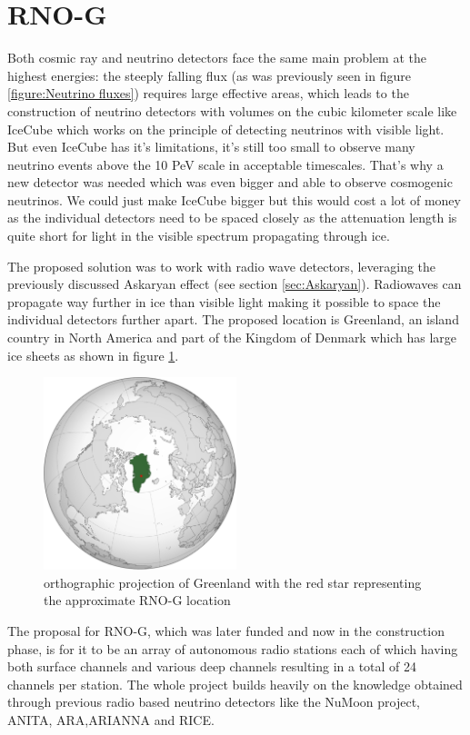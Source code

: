 \section{RNO-G}
Both cosmic ray and neutrino detectors face the same main problem at the
highest energies: the steeply falling flux (as was previously seen in figure
\ref{figure:Neutrino fluxes}) requires large effective areas, which leads to
the construction of neutrino detectors with volumes on the cubic kilometer
scale like IceCube\cite{IceCubeTechnical} which works on the principle of
detecting neutrinos with visible light.  But even IceCube has it's limitations,
it's still too small to observe many neutrino events above the 10 PeV
scale\cite{IceCubeGen2} in acceptable timescales. That's why a new detector was needed which was even
bigger and able to observe cosmogenic neutrinos.  We could just make IceCube
bigger but this would cost a lot of money as the individual detectors need to
be spaced closely as the attenuation length is quite short for light in the
visible spectrum propagating through ice.  

The proposed solution was to work with radio wave detectors, leveraging the
previously discussed Askaryan effect (see section \ref{sec:Askaryan}).  Radiowaves can propagate
way further in ice than visible light making it possible to space the
individual detectors further apart. The proposed location is Greenland, an
island country in North America and part of the Kingdom of Denmark which has
large ice sheets as shown in figure \ref{fig:GreenlandOP}.
\begin{figure}
  \centering
  \includegraphics[width=0.5\textwidth]{figures/GreenlandOP.pdf}
  \caption{orthographic projection of Greenland with the red star representing the approximate RNO-G location}
  \label{fig:GreenlandOP}
\end{figure}
The proposal for RNO-G, which was later funded and now in the construction
phase, is for it to be an array of autonomous radio stations each of which having both
surface channels and various deep channels resulting in a total of 24 channels
per station. The whole project builds heavily on the knowledge obtained through
previous radio based neutrino detectors like the NuMoon\cite{numoon} project,
ANITA\cite{ANITA}, ARA\cite{ARA},ARIANNA\cite{Barwick_2015} and RICE\cite{RICE}.
